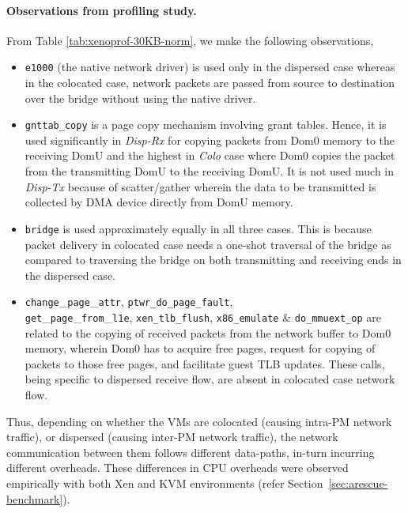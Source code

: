 \paragraph{Observations from profiling study.}
From Table \ref{tab:xenoprof-30KB-norm}, we make the following 
observations,
\begin{itemize}
\item \texttt{e1000} (the native network driver) is used only 
in the dispersed case whereas in the colocated case, network packets are passed 
from source to destination over the bridge without using the native driver.
\item \texttt{gnttab\_copy} is a page copy mechanism involving grant
tables. Hence, it is used significantly in \textit{Disp-Rx} for copying packets
from Dom0 memory to the receiving DomU and the highest in \textit{Colo}
case where Dom0 copies the packet from the transmitting DomU to 
the receiving DomU. It is not used much in \textit{Disp-Tx} 
because of scatter/gather wherein the data to be transmitted is 
collected by DMA device directly from DomU memory. 
\item \texttt{bridge} is used approximately equally in all three cases. 
This is because packet delivery in colocated case needs a one-shot
traversal of the bridge as compared to traversing the bridge on both
transmitting and receiving ends in the dispersed case.
\item \texttt{change}\_\texttt{page}\_\texttt{attr}, 
\texttt{ptwr\_do\_page\_fault}, \\
\texttt{get}\_\texttt{page}\_\texttt{from}\_\texttt{l1e},
\texttt{xen\_tlb\_flush},
\texttt{x86\_emulate}
\& \texttt{do\_mmuext\_op}
are related to the copying of
received packets from the network buffer to Dom0
memory, wherein Dom0 has to acquire free pages, request for copying
of packets to those free pages, and facilitate guest TLB updates.
These calls, being specific to dispersed receive flow, are absent in
colocated case network flow.
\end{itemize}
Thus, depending on whether the VMs are colocated
(causing intra-PM network traffic), 
or dispersed (causing inter-PM network traffic), 
the network communication between them follows
different data-paths, in-turn incurring different overheads.
These differences in CPU overheads were observed empirically with both 
Xen and KVM environments (refer Section~\ref{sec:arescue-benchmark}). 

